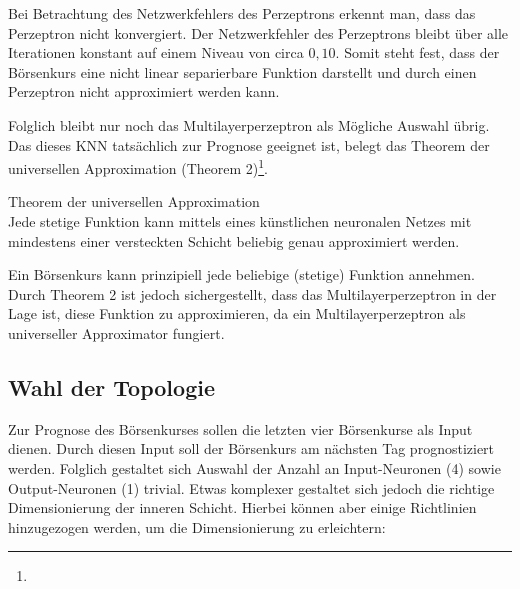 Bei Betrachtung des Netzwerkfehlers des Perzeptrons erkennt man, dass das Perzeptron nicht konvergiert. Der Netzwerkfehler des Perzeptrons bleibt über alle Iterationen konstant auf einem Niveau von circa $0,10$. Somit steht fest, dass der Börsenkurs eine nicht linear separierbare Funktion darstellt und durch einen Perzeptron nicht approximiert werden kann.

Folglich bleibt nur noch das Multilayerperzeptron als Mögliche Auswahl übrig. Das dieses KNN tatsächlich zur Prognose geeignet ist, belegt das Theorem der universellen Approximation (Theorem 2)\footnote{\Vgl{}}.

\begin{theo}Theorem der universellen Approximation\\
Jede stetige Funktion kann mittels eines künstlichen neuronalen Netzes mit mindestens einer versteckten Schicht beliebig genau approximiert werden.
\end{theo}

Ein Börsenkurs kann prinzipiell jede beliebige (stetige) Funktion annehmen. Durch Theorem 2 ist jedoch sichergestellt, dass das Multilayerperzeptron in der Lage ist, diese Funktion zu approximieren, da ein Multilayerperzeptron als universeller Approximator fungiert.

\subsection{Wahl der Topologie}
\label{subsection:Wahl der Topologie}

Zur Prognose des Börsenkurses sollen die letzten vier Börsenkurse als Input dienen. Durch diesen Input soll der Börsenkurs am nächsten Tag prognostiziert werden. Folglich gestaltet sich Auswahl der Anzahl an Input-Neuronen (4) sowie Output-Neuronen (1) trivial.
Etwas komplexer gestaltet sich jedoch die richtige Dimensionierung der inneren Schicht. Hierbei können aber einige Richtlinien hinzugezogen werden, um die Dimensionierung zu erleichtern:

